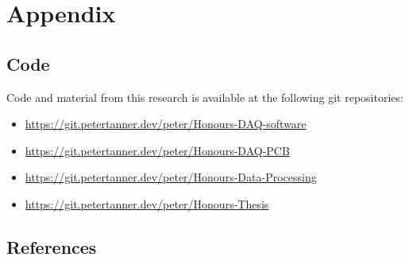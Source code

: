 \documentclass{report}
\begin{document}
\newpage

\section{Appendix}

\subsection{Code}

Code and material from this research is available at the following git repositories:

\begin{itemize}
  \item \url{https://git.petertanner.dev/peter/Honours-DAQ-software}
  \item \url{https://git.petertanner.dev/peter/Honours-DAQ-PCB}
  \item \url{https://git.petertanner.dev/peter/Honours-Data-Processing}
  \item \url{https://git.petertanner.dev/peter/Honours-Thesis}
\end{itemize}

\subsection{References}

\printbibliography[heading=none]
\end{document}

